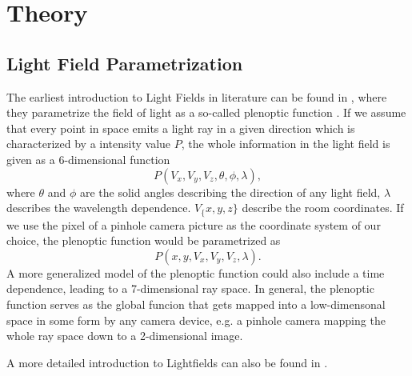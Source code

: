 \documentclass  [
  paper    = a4,
  BCOR     = 10mm,
  twoside,
  fontsize = 12pt,
  fleqn,
  toc      = bibnumbered,
  toc      = listofnumbered,
  numbers  = noendperiod,
  headings = normal,
  listof   = leveldown,
  version  = 3.03
]                                       {scrreprt}
\begin{document}
\chapter{Theory}
\section{Light Field Parametrization}
The earliest introduction to Light Fields in literature can be found in \cite{adelson1991plenoptic}, where they parametrize the field of light as a  so-called \glqq plenoptic function \grqq. If we assume that every point in space emits a light ray  in a given direction which is characterized by a intensity value $P$, the whole information in the light field is given as a 6-dimensional function
\begin{equation}\label{key}
P(V_x,V_y, V_z, \theta, \phi, \lambda),
\end{equation}
where $\theta$ and $\phi$ are the solid angles describing the direction of any light field, $\lambda$ describes the wavelength dependence. $V_\{x,y,z\}$ describe the room coordinates. If we use the pixel of a pinhole camera picture as the coordinate system of our choice, the plenoptic function would be parametrized as 
\begin{equation}\label{eq:plenoptic}
P(x,y, V_x, V_y, V_z, \lambda).
\end{equation}
 A more generalized model of the plenoptic function could also include a time dependence, leading to a 7-dimensional ray space. In general, the plenoptic function serves as the global funcion that gets mapped into a low-dimensonal space in some form by any camera device, e.g. a pinhole camera mapping the whole ray space down to a 2-dimensional image.\\
 	
 A more detailed introduction to Lightfields can also be found in \cite{wanner2014orientation}. 
\end{document}

